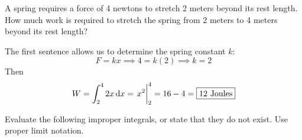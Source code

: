 \documentclass[12pt,answers]{exam}
\begin{document}
\begin{questions}

\question[8]
A spring requires a force of 4 newtons to stretch 2 meters beyond its rest length. How much work is required to stretch the spring from 2 meters to 4 meters beyond its rest length?
\begin{solution}
	The first sentence allows us to determine the spring constant $k$:
	\[
		F = kx 
		\implies 4 = k (2)
		\implies k = 2
	\]
	Then
	\[
		W = \int_2^4 2x \dif x = \eval{x^2}_2^4 = 16 - 4 = \boxed{12 \text{ Joules}}
	\]
\end{solution}

\newpage
\question Evaluate the following improper integrals, or state that they do not exist. Use proper limit notation.
\end{questions}
\end{document}
